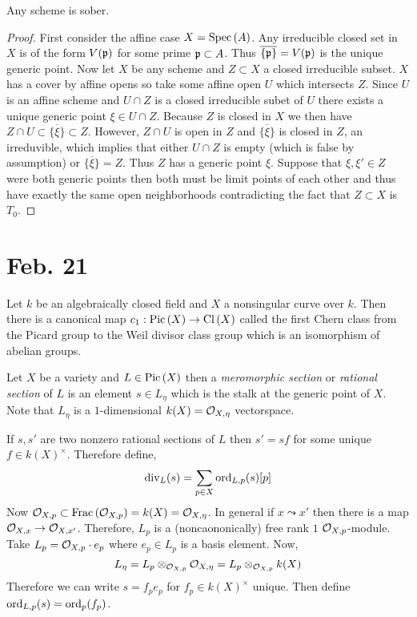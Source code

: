 \documentclass[12pt]{article}
\begin{document}
\begin{proposition}
Any scheme is sober. 
\end{proposition}

\begin{proof}
First consider the affine case $X = \mathrm{Spec}\left( A \right)$. Any irreducible closed set in $X$ is of the form $V(\mathfrak{p})$ for some prime $\mathfrak{p} \subset A$. Thus $\overline{\{ \mathfrak{p} \}} = V(\mathfrak{p})$ is the unique generic point. Now let $X$ be any scheme and $Z \subset X$ a closed irreducible subset. $X$ has a cover by affine opens so take some affine open $U$ which intersects $Z$. Since $U$ is an affine scheme and $U \cap Z$ is a closed irreducible subet of $U$ there exists a unique generic point $\xi \in U \cap Z$. Because $Z$ is closed in $X$ we then have $Z \cap U \subset \overline{\{\xi\}} \subset Z$. However, $Z \cap U$ is open in $Z$ and $\overline{\{\xi\}}$ is closed in $Z$, an irreduvible, which implies that either $U \cap Z$ is empty (which is false by assumption) or $\overline{\{\xi\}} = Z$. Thus $Z$ has a generic point $\xi$. Suppose that $\xi, \xi' \in Z$ were both generic points then both must be limit points of each other and thus have exactly the same open neighborhoods contradicting the fact that $Z \subset X$ is $T_0$. 
\end{proof}

\section{Feb. 21}

\begin{theorem}
Let $k$ be an algebraically closed field and $X$ a nonsingular curve over $k$. Then there is a canonical map $c_1 : \mathrm{Pic} \left( X \right) \to \mathrm{Cl} \left( X \right)$ called the first Chern class from the Picard group to the Weil divisor class group which is an isomorphism of abelian groups. 
\end{theorem}

\begin{definition}
Let $X$ be a variety and $L \in \mathrm{Pic} \left( X \right)$ then a \textit{meromorphic section} or \textit{rational section} of $L$ is an element $s \in L_\eta$ which is the stalk at the generic point of $X$. Note that $L_\eta$ is a $1$-dimensional $k(X) = \mathcal{O}_{X, \eta}$ vectorspace. 
\end{definition}



\begin{definition}
If $s, s'$ are two nonzero rational sections of $L$ then $s' = s f$ for some unique $f \in k(X)^\times$. Therefore define,
\[ \mathrm{div}_L(s) = \sum_{p \in X} \mathrm{ord}_{L, p}(s) [p] \]
Now $\mathcal{O}_{X, p} \subset \mathrm{Frac}\left(\mathcal{O}_{X, p}\right) = k(X) = \mathcal{O}_{X, \eta}$. In general if $x \leadsto x'$ then there is a map $\mathcal{O}_{X, x} \to \mathcal{O}_{X, x'}$. Therefore, $L_p$ is a (noncaononically) free rank $1$ $\mathcal{O}_{X, p}$-module. Take $L_p = \mathcal{O}_{X, p} \cdot e_p$ where $e_p \in L_p$ is a basis element. Now, 
\[ L_\eta = L_p \otimes_{\mathcal{O}_{X, p}} \mathcal{O}_{X, \eta} = L_p \otimes_{\mathcal{O}_{X, p}} k(X) \]
Therefore we can write $s = f_p e_p$ for $f_p \in k(X)^\times$ unique. Then define $\mathrm{ord}_{L,p}(s) = \mathrm{ord}_p(f_p)$. 
\end{definition}
\end{document}
